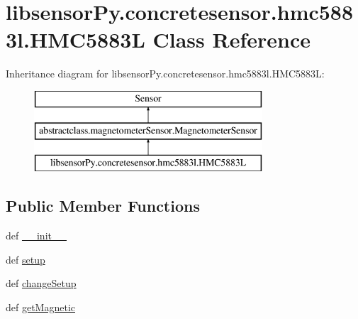 \hypertarget{classlibsensorPy_1_1concretesensor_1_1hmc5883l_1_1HMC5883L}{}\section{libsensor\+Py.\+concretesensor.\+hmc5883l.\+H\+M\+C5883\+L Class Reference}
\label{classlibsensorPy_1_1concretesensor_1_1hmc5883l_1_1HMC5883L}
Inheritance diagram for libsensor\+Py.\+concretesensor.\+hmc5883l.\+H\+M\+C5883\+L\+:\begin{figure}[H]
\begin{center}
\leavevmode
\includegraphics[height=3.000000cm]{classlibsensorPy_1_1concretesensor_1_1hmc5883l_1_1HMC5883L}
\end{center}
\end{figure}
\subsection*{Public Member Functions}
\begin{DoxyCompactItemize}
\item 
def \hyperlink{classlibsensorPy_1_1concretesensor_1_1hmc5883l_1_1HMC5883L_ac833fff8e1301262182f998caf03ff53}{\+\_\+\+\_\+init\+\_\+\+\_\+}
\item 
def \hyperlink{classlibsensorPy_1_1concretesensor_1_1hmc5883l_1_1HMC5883L_a4d5543108427c005bec18436f65c99ca}{setup}
\item 
def \hyperlink{classlibsensorPy_1_1concretesensor_1_1hmc5883l_1_1HMC5883L_ac620988a5eed0a9f07d6f733f51f680a}{change\+Setup}
\item 
def \hyperlink{classlibsensorPy_1_1concretesensor_1_1hmc5883l_1_1HMC5883L_ab073f48645952249ad124fae34092ac9}{get\+Magnetic}
\end{DoxyCompactItemize}
